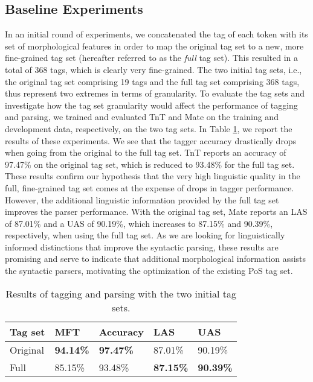 \documentclass[11pt,a4paper]{article}
\begin{document}
\subsection{Baseline Experiments}
In an initial round of experiments, we concatenated the tag of each token with
its set of morphological features in order to map the original tag set to a
new, more fine-grained tag set (hereafter referred to as the \emph{full} tag
set). This resulted in a total of 368 tags, which is clearly very fine-grained.
The two initial tag sets, i.e., the original tag set comprising 19 tags and the
full tag set comprising 368 tags, thus represent two extremes in terms of
granularity. To evaluate the tag sets and investigate how the tag set
granularity would affect the performance of tagging and parsing, we trained and
evaluated TnT and Mate on the training and development data, respectively, on
the two tag sets. In Table \ref{inittagseteval}, we report the results of these
experiments. We see that the tagger accuracy drastically drops when going from
the original to the full tag set. TnT reports an accuracy of 97.47\% on the
original tag set, which is reduced to 93.48\% for the full tag set. These
results confirm our hypothesis that the very high linguistic quality in the
full, fine-grained tag set comes at the expense of drops in tagger performance.
However, the additional linguistic information provided by the full tag set
improves the parser performance. With the original tag set, Mate reports an LAS
of 87.01\% and a UAS of 90.19\%, which increases to 87.15\% and 90.39\%,
respectively, when using the full tag set. As we are looking for linguistically
informed distinctions that improve the syntactic parsing, these results are
promising and serve to indicate that additional morphological information
assists the syntactic parsers, motivating the optimization of the existing PoS
tag set.

\begin{table}
    \centering
    \smaller[0.5]
    \begin{tabular}{@{}lllll@{}}
        \toprule
        \textbf{Tag set} & \textbf{MFT} & \textbf{Accuracy} &
        \textbf{LAS} & \textbf{UAS} \\
        \midrule
        Original & \textbf{94.14\%} & \textbf{97.47\%} & 87.01\% & 90.19\% \\
        Full & 85.15\% & 93.48\% & \textbf{87.15\%} & \textbf{90.39\%} \\
        \bottomrule
    \end{tabular}
    \caption{Results of tagging and parsing with the two initial tag sets.}
    \label{inittagseteval}
\end{table}
\end{document}
